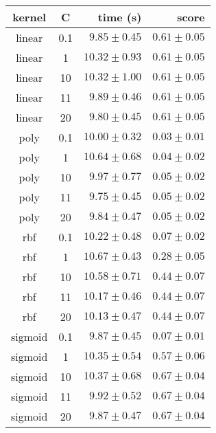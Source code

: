 \begin{tabular}{ccrr}
\toprule
\textbf{kernel} & \textbf{C} & \textbf{time (s)} & \textbf{score}\\
\midrule
linear & 0.1 & $9.85 \pm 0.45$ & $0.61 \pm 0.05$\\
linear & 1 & $10.32 \pm 0.93$ & $0.61 \pm 0.05$\\
linear & 10 & $10.32 \pm 1.00$ & $0.61 \pm 0.05$\\
linear & 11 & $9.89 \pm 0.46$ & $0.61 \pm 0.05$\\
linear & 20 & $9.80 \pm 0.45$ & $0.61 \pm 0.05$\\
poly & 0.1 & $10.00 \pm 0.32$ & $0.03 \pm 0.01$\\
poly & 1 & $10.64 \pm 0.68$ & $0.04 \pm 0.02$\\
poly & 10 & $9.97 \pm 0.77$ & $0.05 \pm 0.02$\\
poly & 11 & $9.75 \pm 0.45$ & $0.05 \pm 0.02$\\
poly & 20 & $9.84 \pm 0.47$ & $0.05 \pm 0.02$\\
rbf & 0.1 & $10.22 \pm 0.48$ & $0.07 \pm 0.02$\\
rbf & 1 & $10.67 \pm 0.43$ & $0.28 \pm 0.05$\\
rbf & 10 & $10.58 \pm 0.71$ & $0.44 \pm 0.07$\\
rbf & 11 & $10.17 \pm 0.46$ & $0.44 \pm 0.07$\\
rbf & 20 & $10.13 \pm 0.47$ & $0.44 \pm 0.07$\\
sigmoid & 0.1 & $9.87 \pm 0.45$ & $0.07 \pm 0.01$\\
sigmoid & 1 & $10.35 \pm 0.54$ & $0.57 \pm 0.06$\\
sigmoid & 10 & $10.37 \pm 0.68$ & $0.67 \pm 0.04$\\
sigmoid & 11 & $9.92 \pm 0.52$ & $0.67 \pm 0.04$\\
sigmoid & 20 & $9.87 \pm 0.47$ & $0.67 \pm 0.04$\\
\bottomrule
\end{tabular}
